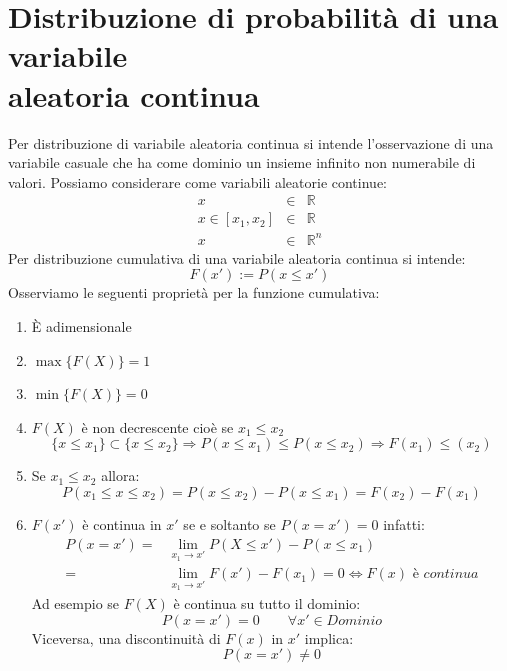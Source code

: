 \documentclass[11pt,a4paper]{book}
\begin{document}
\section[Distribuzione aleatoria continua]{Distribuzione di probabilità di una variabile\\ aleatoria continua}  \label{Distribuzione di variabile aleatoria continua}
Per distribuzione di variabile aleatoria continua si intende l'osservazione di una variabile casuale che ha come dominio un insieme infinito non numerabile di valori. Possiamo considerare come variabili aleatorie continue:
\begin{eqnarray}
x &\in& \mathbb{R} \\
x \in [x_1,x_2] &\in& \mathbb{R} \\
x &\in& \mathbb{R}^n
\end{eqnarray}
Per distribuzione cumulativa di una variabile aleatoria continua si intende: 
\begin{equation}
F(x') := P(x \leq x')
\end{equation}
Osserviamo le seguenti proprietà per la funzione cumulativa:
\begin{enumerate}
\item \`{E} adimensionale
\item $ \max\{F(X)\} = 1 $
\item $ \min\{F(X)\}=0 $
\item $ F(X) $ è non decrescente cioè se $ x_1 \leq x_2 $ \label{Distribuzione di probabilità continua: non decrescenza}
\begin{equation}
\{x\leq x_1\} \subset \{x \leq x_2\} \Rightarrow P(x \leq x_1) \leq P(x \leq x_2) \Rightarrow F(x_1) \leq (x_2)
\end{equation}
\item Se $ x_1 \leq x_2 $ allora:
\begin{equation}
P(x_1 \leq x \leq x_2) = P(x\leq x_2) - P(x \leq x_1) = F(x_2) -F(x_1)
\end{equation}
\item $ F(x') $ è continua in $ x' $ se e soltanto se $ P(x = x') = 0 $ infatti:
\begin{align}
P(x = x') =& \lim\limits_{x_1 \to x'} P(X \leq x') - P(x \leq x_1) \\
=& \lim\limits_{x_1 \to x'} F(x')-F(x_1) = 0 \Leftrightarrow F(x)\textit{ è continua}
\end{align}
Ad esempio se $ F(X) $ è continua su tutto il dominio:
\begin{equation}
P(x = x') = 0 \qquad \forall x' \in \textit{Dominio}
\end{equation}
Viceversa, una discontinuità di $ F(x) $ in $ x' $ implica:
\begin{equation}
P(x = x') \neq 0
\end{equation}
\end{enumerate}
\end{document}
